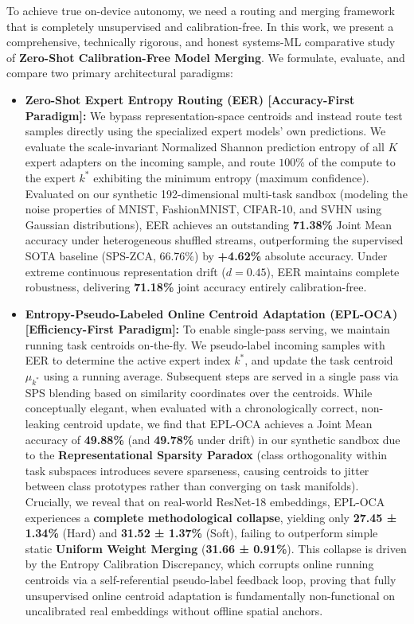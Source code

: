 To achieve true on-device autonomy, we need a routing and merging framework that is completely unsupervised and calibration-free. In this work, we present a comprehensive, technically rigorous, and honest systems-ML comparative study of \textbf{Zero-Shot Calibration-Free Model Merging}. We formulate, evaluate, and compare two primary architectural paradigms:
\begin{itemize}
    \item \textbf{Zero-Shot Expert Entropy Routing (EER) [Accuracy-First Paradigm]:} We bypass representation-space centroids and instead route test samples directly using the specialized expert models' own predictions. We evaluate the scale-invariant Normalized Shannon prediction entropy of all $K$ expert adapters on the incoming sample, and route $100\%$ of the compute to the expert $k^*$ exhibiting the minimum entropy (maximum confidence). Evaluated on our synthetic 192-dimensional multi-task sandbox (modeling the noise properties of MNIST, FashionMNIST, CIFAR-10, and SVHN using Gaussian distributions), EER achieves an outstanding \textbf{71.38\%} Joint Mean accuracy under heterogeneous shuffled streams, outperforming the supervised SOTA baseline (SPS-ZCA, 66.76\%) by \textbf{+4.62\%} absolute accuracy. Under extreme continuous representation drift ($d=0.45$), EER maintains complete robustness, delivering \textbf{71.18\%} joint accuracy entirely calibration-free.
    \item \textbf{Entropy-Pseudo-Labeled Online Centroid Adaptation (EPL-OCA) [Efficiency-First Paradigm]:} To enable single-pass serving, we maintain running task centroids on-the-fly. We pseudo-label incoming samples with EER to determine the active expert index $k^*$, and update the task centroid $\mu_{k^*}$ using a running average. Subsequent steps are served in a single pass via SPS blending based on similarity coordinates over the centroids. While conceptually elegant, when evaluated with a chronologically correct, non-leaking centroid update, we find that EPL-OCA achieves a Joint Mean accuracy of \textbf{49.88\%} (and \textbf{49.78\%} under drift) in our synthetic sandbox due to the \textbf{Representational Sparsity Paradox} (class orthogonality within task subspaces introduces severe sparseness, causing centroids to jitter between class prototypes rather than converging on task manifolds). Crucially, we reveal that on real-world ResNet-18 embeddings, EPL-OCA experiences a \textbf{complete methodological collapse}, yielding only \textbf{27.45 ± 1.34\%} (Hard) and \textbf{31.52 ± 1.37\%} (Soft), failing to outperform simple static \textbf{Uniform Weight Merging} (\textbf{31.66 ± 0.91\%}). This collapse is driven by the Entropy Calibration Discrepancy, which corrupts online running centroids via a self-referential pseudo-label feedback loop, proving that fully unsupervised online centroid adaptation is fundamentally non-functional on uncalibrated real embeddings without offline spatial anchors.
\end{itemize}

